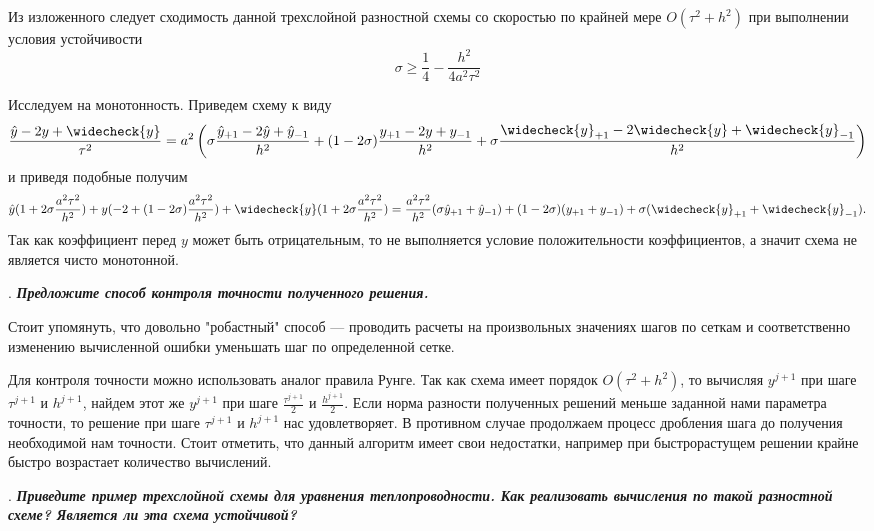 \documentclass[12pt, a4paper]{article}
\newcounter{mycounter}
\newcommand{\quastion}[1]{%
	\stepcounter{mycounter}%
	\textbf{\themycounter}.  %
	\textbf{\textit{#1}}
	
}
\newcommand{\down}[1]{\widecheck{#1}}
\begin{document}
	Из изложенного следует сходимость данной трехслойной разностной схемы со скоростью по крайней мере $O(\tau^2 + h^2)$ при выполнении условия устойчивости
	\begin{equation*}
		\sigma \ge \frac{1}{4} - \frac{h^2}{4a^2 \tau^2}
	\end{equation*}
	
	Исследуем на монотонность. Приведем схему к виду
	\begin{equation*}
		\frac{\hat{y} - 2y + \widecheck{y}}{\tau^2} = a^2 \left( \sigma \frac{\hat{y}_{+1} - 2 \hat{y} + \hat{y}_{-1}}{h^2} + (1 - 2 \sigma) \frac{y_{+1} - 2 y + y_{-1}}{h^2} + \sigma \frac{\widecheck{y}_{+1} - 2 \widecheck{y} + \widecheck{y}_{-1}}{h^2} \right)
	\end{equation*}
	и приведя подобные получим
	\begin{equation*}
		\hat{y}(1 + 2\sigma \frac{a^2 \tau^2}{h^2}) + y (-2 + (1-2\sigma) \frac{a^2 \tau^2}{h^2}) + \down{y}(1 + 2\sigma \frac{a^2 \tau^2}{h^2}) = \frac{a^2 \tau^2}{h^2} (\sigma \hat{y}_{+1} + \hat{y}_{-1}) + (1 - 2\sigma)(y_{+1} + y_{-1}) + \sigma( \down{y}_{+1} + \down{y}_{-1}).
	\end{equation*}
	Так как коэффициент перед $y$ может быть отрицательным, то не выполняется условие положительности коэффициентов, а значит схема не является чисто монотонной.
	
	\quastion{Предложите способ контроля точности полученного решения.}
	
	Стоит упомянуть, что довольно "робастный" способ --- проводить расчеты на произвольных значениях шагов по сеткам и соответственно изменению вычисленной ошибки уменьшать шаг по определенной сетке. 
	
	Для контроля точности можно использовать аналог правила Рунге. Так как схема имеет порядок $O(\tau^2 + h^2)$, то вычисляя $y^{j+1}$ при шаге $\tau^{j+1}$ и $h^{j+1}$, найдем этот же $y^{j+1}$ при шаге $\frac{\tau^{j+1}}{2}$ и $\frac{h^{j+1}}{2}$. Если норма разности полученных решений меньше заданной нами параметра точности, то решение при шаге $\tau^{j+1}$ и $h^{j+1}$ нас удовлетворяет. В противном случае продолжаем процесс дробления шага до получения необходимой нам точности. Стоит отметить, что данный алгоритм имеет свои недостатки, например при быстрорастущем решении крайне быстро возрастает количество вычислений.
	
	
	
	
	\quastion{Приведите пример трехслойной схемы для уравнения теплопроводности. Как реализовать вычисления по такой разностной схеме? Является ли эта схема устойчивой?}
	
\end{document}
